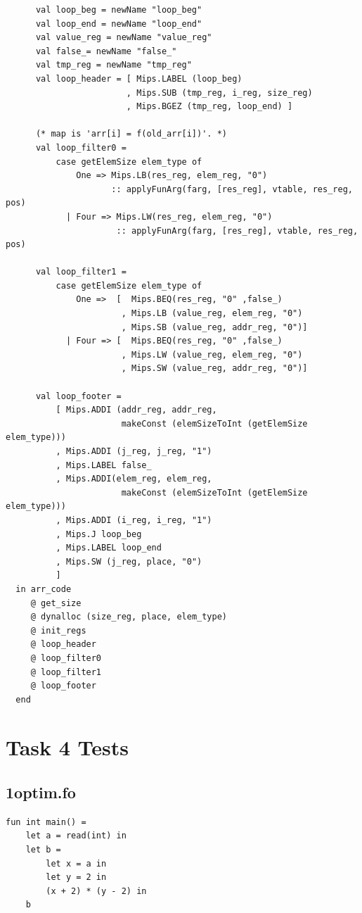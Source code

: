 \documentclass[11pt]{article}
\begin{document}
\begin{lstlisting}
      val loop_beg = newName "loop_beg"
      val loop_end = newName "loop_end"
      val value_reg = newName "value_reg"
      val false_= newName "false_"
      val tmp_reg = newName "tmp_reg"
      val loop_header = [ Mips.LABEL (loop_beg)
                        , Mips.SUB (tmp_reg, i_reg, size_reg)
                        , Mips.BGEZ (tmp_reg, loop_end) ]

      (* map is 'arr[i] = f(old_arr[i])'. *)
      val loop_filter0 =
          case getElemSize elem_type of
              One => Mips.LB(res_reg, elem_reg, "0")
                     :: applyFunArg(farg, [res_reg], vtable, res_reg, pos)
            | Four => Mips.LW(res_reg, elem_reg, "0")
                      :: applyFunArg(farg, [res_reg], vtable, res_reg, pos)

      val loop_filter1 =
          case getElemSize elem_type of
              One =>  [  Mips.BEQ(res_reg, "0" ,false_)
                       , Mips.LB (value_reg, elem_reg, "0")
                       , Mips.SB (value_reg, addr_reg, "0")]
            | Four => [  Mips.BEQ(res_reg, "0" ,false_)
                       , Mips.LW (value_reg, elem_reg, "0")
                       , Mips.SW (value_reg, addr_reg, "0")]

      val loop_footer =
          [ Mips.ADDI (addr_reg, addr_reg,
                       makeConst (elemSizeToInt (getElemSize elem_type)))
          , Mips.ADDI (j_reg, j_reg, "1")
          , Mips.LABEL false_
          , Mips.ADDI(elem_reg, elem_reg,
                       makeConst (elemSizeToInt (getElemSize elem_type)))
          , Mips.ADDI (i_reg, i_reg, "1")
          , Mips.J loop_beg
          , Mips.LABEL loop_end
          , Mips.SW (j_reg, place, "0")
          ]
  in arr_code
     @ get_size
     @ dynalloc (size_reg, place, elem_type)
     @ init_regs
     @ loop_header
     @ loop_filter0
     @ loop_filter1
     @ loop_footer
  end
    \end{lstlisting}

    \section{Task 4 Tests}

    \subsection{1optim.fo}
    \begin{lstlisting}
fun int main() =
    let a = read(int) in
    let b =
        let x = a in
        let y = 2 in
        (x + 2) * (y - 2) in
    b
    \end{lstlisting}
\end{document}
